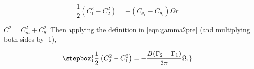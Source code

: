 
\begin{equation}
    \frac{1}{2} \left(C_{1}^2 - C_{2}^2 \right) = -(C_{\theta_1} - C_{\theta_2}) \Omega r
\end{equation}

\where \(C^2 = C_m^2 + C_\theta^2\).
Then applying the definition in \cref{eqn:gamma2pre} (and multiplying both sides by -1),

\begin{equation}
    \label{eqn:vjumprel}
    \stepbox{
    \frac{1}{2} \left(C_{2}^2 - C_{1}^2 \right) =  -\frac{B(\Gamma_2-\Gamma_1)}{2 \pi} \Omega.
}
\end{equation}





